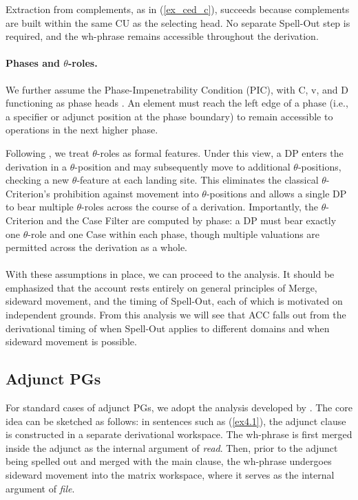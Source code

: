 \documentclass[12pt]{article}
\begin{document}
Extraction from complements, as in (\ref{ex_ced_c}), succeeds because complements are built within the same CU as the selecting head. No separate Spell-Out step is required, and the wh-phrase remains accessible throughout the derivation.

\paragraph{Phases and $\theta$-roles.} We further assume the Phase-Impenetrability Condition (PIC), with C, v, and D functioning as phase heads \citep{chomsky2001}. An element must reach the left edge of a phase (i.e., a specifier or adjunct position at the phase boundary) to remain accessible to operations in the next higher phase.

Following \cite{hornstein1999}, we treat $\theta$-roles as formal features. Under this view, a DP enters the derivation in a $\theta$-position and may subsequently move to additional $\theta$-positions, checking a new $\theta$-feature at each landing site. This eliminates the classical $\theta$-Criterion’s prohibition against movement into $\theta$-positions and allows a single DP to bear multiple $\theta$-roles across the course of a derivation. Importantly, the $\theta$-Criterion and the Case Filter are computed by phase: a DP must bear exactly one $\theta$-role and one Case within each phase, though multiple valuations are permitted across the derivation as a whole.

\paragraph{} With these assumptions in place, we can proceed to the analysis. It should be emphasized that the account rests entirely on general principles of Merge, sideward movement, and the timing of Spell-Out, each of which is motivated on independent grounds. From this analysis we will see that ACC falls out from the derivational timing of when Spell-Out applies to different domains and when sideward movement is possible.

\subsection{Adjunct PGs}

For standard cases of adjunct PGs, we adopt the analysis developed by \cite{nunes2000}. The core idea can be sketched as follows: in sentences such as (\ref{ex4.1}), the adjunct clause is constructed in a separate derivational workspace. The wh-phrase is first merged inside the adjunct as the internal argument of \textit{read}. Then, prior to the adjunct being spelled out and merged with the main clause, the wh-phrase undergoes sideward movement into the matrix workspace, where it serves as the internal argument of \textit{file}.
\end{document}
